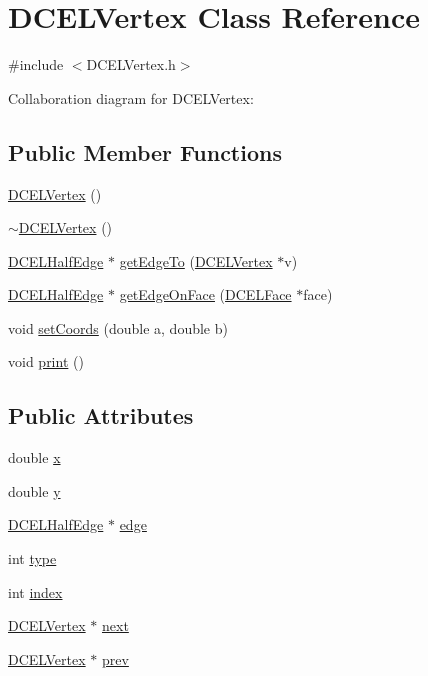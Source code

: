 \hypertarget{classDCELVertex}{}\section{D\+C\+E\+L\+Vertex Class Reference}
\label{classDCELVertex}


{\ttfamily \#include $<$D\+C\+E\+L\+Vertex.\+h$>$}



Collaboration diagram for D\+C\+E\+L\+Vertex\+:
\subsection*{Public Member Functions}
\begin{DoxyCompactItemize}
\item 
\hyperlink{classDCELVertex_a23e4b7015f229fb6407af16b688fe591}{D\+C\+E\+L\+Vertex} ()
\item 
\hyperlink{classDCELVertex_a4f923ecc1dfab7f42b77906976e4fa65}{$\sim$\+D\+C\+E\+L\+Vertex} ()
\item 
\hyperlink{classDCELHalfEdge}{D\+C\+E\+L\+Half\+Edge} $\ast$ \hyperlink{classDCELVertex_a37934a45288b301b5a121d3f9ca6d397}{get\+Edge\+To} (\hyperlink{classDCELVertex}{D\+C\+E\+L\+Vertex} $\ast$v)
\item 
\hyperlink{classDCELHalfEdge}{D\+C\+E\+L\+Half\+Edge} $\ast$ \hyperlink{classDCELVertex_adb618816fa01f50c582ab566ada64050}{get\+Edge\+On\+Face} (\hyperlink{classDCELFace}{D\+C\+E\+L\+Face} $\ast$face)
\item 
void \hyperlink{classDCELVertex_ac5fc5f521ad50fa5a2b334b530b7e00e}{set\+Coords} (double a, double b)
\item 
void \hyperlink{classDCELVertex_a539320f1cf040fd81da7db9f2fd3078f}{print} ()
\end{DoxyCompactItemize}
\subsection*{Public Attributes}
\begin{DoxyCompactItemize}
\item 
double \hyperlink{classDCELVertex_a0a8a36f7b24698829b31ab03e01dd07d}{x}
\item 
double \hyperlink{classDCELVertex_aa9ca8760cf4043aeb5c7d9d981d9bb99}{y}
\item 
\hyperlink{classDCELHalfEdge}{D\+C\+E\+L\+Half\+Edge} $\ast$ \hyperlink{classDCELVertex_a1fd640a6409cfb724e312a9c59876493}{edge}
\item 
int \hyperlink{classDCELVertex_a7c389ebf0d0887e1be79ba4da089522c}{type}
\item 
int \hyperlink{classDCELVertex_a7d62808f634eb35187137a1a9dd4235a}{index}
\item 
\hyperlink{classDCELVertex}{D\+C\+E\+L\+Vertex} $\ast$ \hyperlink{classDCELVertex_a5eadf032ea2d74d0448e26aede36aaf0}{next}
\item 
\hyperlink{classDCELVertex}{D\+C\+E\+L\+Vertex} $\ast$ \hyperlink{classDCELVertex_a00e5cbac7901ae7c8c786597502ed6d8}{prev}
\end{DoxyCompactItemize}


